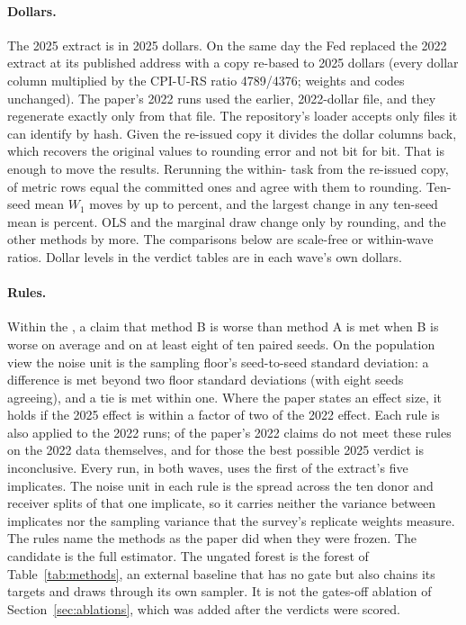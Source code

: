 \paragraph{Dollars.} The 2025 extract is in 2025 dollars. On the same day the
Fed replaced the 2022 extract at its published address with a copy re-based
to 2025 dollars (every dollar column multiplied by the CPI-U-RS ratio
4789/4376; weights and codes unchanged). The paper's 2022 runs used the
earlier, 2022-dollar file, and they regenerate exactly only from that file.
The repository's loader accepts only files it can identify by hash. Given
the re-issued copy it divides the dollar columns back, which recovers the
original values to rounding error and not bit for bit. That is enough to
move the results. Rerunning the within-\scf{} task from the re-issued copy,
 of  metric rows equal the
committed ones and  agree with them to rounding.
Ten-seed mean $W_1$ moves by up to  percent, and
the largest change in any ten-seed mean is 
percent. OLS and the marginal draw change only by rounding, and the other
methods by more. The comparisons below are
scale-free or within-wave ratios. Dollar levels in the verdict tables are in each wave's own dollars.

\paragraph{Rules.} Within the \scf{}, a claim that method B is worse than
method A is met when B is worse on average and on at least eight of ten
paired seeds. On the population view the noise unit is the sampling floor's
seed-to-seed standard deviation: a difference is met beyond two floor
standard deviations (with eight seeds agreeing), and a tie is met within one.
Where the paper states an effect size, it holds if the 2025 effect is within
a factor of two of the 2022 effect. Each rule is also applied to the 2022
runs;  of the paper's 2022 claims do not meet
these rules on the 2022 data themselves, and for those the best possible 2025 verdict is inconclusive.
Every run, in both waves, uses the first of the extract's five implicates.
The noise unit in each rule is the spread across the ten donor and receiver
splits of that one implicate, so it carries neither the variance between
implicates nor the sampling variance that the survey's replicate weights
measure.
The rules name the methods as the paper did when they were frozen. The
candidate is the full estimator. The ungated forest is the \microimpute{}
forest of Table~\ref{tab:methods}, an external baseline that has no gate
but also chains its targets and draws through its own sampler. It is not the
gates-off ablation of Section~\ref{sec:ablations}, which was added after the
verdicts were scored.

